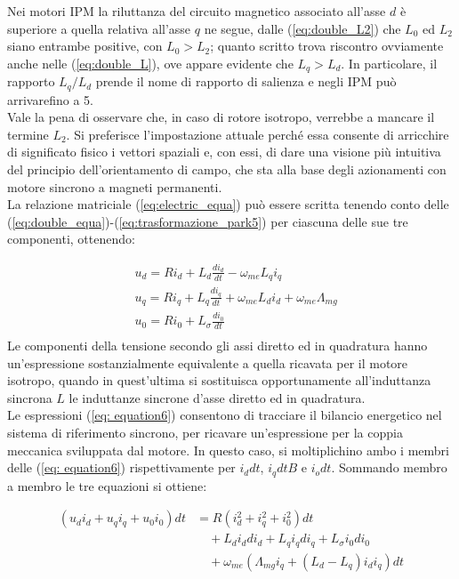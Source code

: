 Nei motori 
IPM la riluttanza del circuito magnetico associato all’asse $d$ è superiore a quella
relativa all’asse $q$ ne segue, dalle (\ref{eq:double_L2}) che $L_0$ ed $L_2$ siano entrambe positive, con
$L_0>L_2$; quanto scritto trova riscontro ovviamente anche nelle (\ref{eq:double_L}), ove
appare evidente che $L_q>L_d$. In particolare, il rapporto $L_q/L_d$ prende il nome
di rapporto di salienza e negli IPM può arrivarefino a 5.\\
Vale la pena di osservare che, in caso di rotore isotropo, verrebbe a mancare
il termine $L_2$. Si
preferisce l’impostazione attuale perché essa consente di arricchire di significato  fisico i vettori spaziali e, con essi, di dare una visione più intuitiva del principio
dell’orientamento di campo, che sta alla base degli azionamenti con motore
sincrono a magneti permanenti.\\
La relazione matriciale (\ref{eq:electric_equa}) può essere scritta tenendo conto delle (\ref{eq:double_equa})-(\ref{eq:trasformazione_park5})
per ciascuna delle sue tre componenti, ottenendo:

\begin{equation}
\begin{aligned}
    &u_d=Ri_d+L_d\frac{di_d}{dt}-\omega_{me}L_qi_q\\
    &u_q=Ri_q+L_q\frac{di_q}{dt}+\omega_{me}L_di_d+\omega_{me}\Lambda_{mg}\\
    &u_0=Ri_0+L_\sigma\frac{di_0}{dt}\\
    \end{aligned}
\label{eq: equation6}
\end{equation}
Le componenti della tensione secondo gli assi diretto ed in quadratura
hanno un’espressione sostanzialmente equivalente a quella ricavata per il motore
isotropo, quando in quest’ultima si sostituisca opportunamente all’induttanza
sincrona $L$ le induttanze sincrone d’asse diretto ed in quadratura.\\
Le espressioni (\ref{eq: equation6}) consentono di tracciare il bilancio energetico nel sistema
di riferimento sincrono, per ricavare un’espressione per la coppia meccanica
    sviluppata dal motore. In questo caso, si moltiplichino ambo i membri delle (\ref{eq: equation6}) rispettivamente per $i_ddt$, $i_qdtB$ e $i_odt$. Sommando membro a membro le tre
equazioni si ottiene:

\begin{equation}
\begin{aligned}
(u_d i_d + u_q i_q + u_0 i_0) dt &= R \left( i_d^2 + i_q^2 + i_0^2 \right) dt \\
&\quad + L_d i_d di_d + L_q i_q di_q + L_\sigma i_0 di_0 \\
&\quad + \omega_{me} \left( \Lambda_{mg} i_q + (L_d - L_q) i_d i_q \right) dt
\end{aligned}
\label{eq:bilancio_potenza}
\end{equation}

